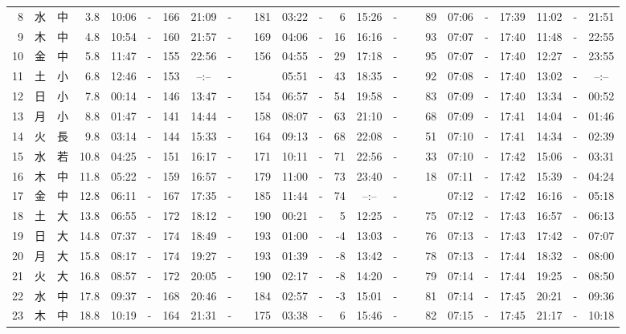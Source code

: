 \documentclass[12pt,a4j]{jsarticle}
\begin{document}
\begin{table}[htbp]
\begin{center}
{\begin{tabular}{|rc|cr|ccrccr|ccrccr|ccc|ccc|}
 8 & 水 & 中 &  3.8 &  10:06 &-& 166 &  21:09 &-& 181 &  03:22 &-&   6 &  15:26 &-&  89 & 07:06 & -& 17:39 & 11:02 & -& 21:51 \\
 9 & 木 & 中 &  4.8 &  10:54 &-& 160 &  21:57 &-& 169 &  04:06 &-&  16 &  16:16 &-&  93 & 07:07 & -& 17:40 & 11:48 & -& 22:55 \\
10 & 金 & 中 &  5.8 &  11:47 &-& 155 &  22:56 &-& 156 &  04:55 &-&  29 &  17:18 &-&  95 & 07:07 & -& 17:40 & 12:27 & -& 23:55 \\
11 & 土 & 小 &  6.8 &  12:46 &-& 153 &  --:-- &-&~~~~~ &  05:51 &-&  43 &  18:35 &-&  92 & 07:08 & -& 17:40 & 13:02 & -& --:-- \\
12 & 日 & 小 &  7.8 &  00:14 &-& 146 &  13:47 &-& 154 &  06:57 &-&  54 &  19:58 &-&  83 & 07:09 & -& 17:40 & 13:34 & -& 00:52 \\
13 & 月 & 小 &  8.8 &  01:47 &-& 141 &  14:44 &-& 158 &  08:07 &-&  63 &  21:10 &-&  68 & 07:09 & -& 17:41 & 14:04 & -& 01:46 \\
14 & 火 & 長 &  9.8 &  03:14 &-& 144 &  15:33 &-& 164 &  09:13 &-&  68 &  22:08 &-&  51 & 07:10 & -& 17:41 & 14:34 & -& 02:39 \\
15 & 水 & 若 & 10.8 &  04:25 &-& 151 &  16:17 &-& 171 &  10:11 &-&  71 &  22:56 &-&  33 & 07:10 & -& 17:42 & 15:06 & -& 03:31 \\
16 & 木 & 中 & 11.8 &  05:22 &-& 159 &  16:57 &-& 179 &  11:00 &-&  73 &  23:40 &-&  18 & 07:11 & -& 17:42 & 15:39 & -& 04:24 \\
17 & 金 & 中 & 12.8 &  06:11 &-& 167 &  17:35 &-& 185 &  11:44 &-&  74 &  --:-- &-&~~~~~ & 07:12 & -& 17:42 & 16:16 & -& 05:18 \\
18 & 土 & 大 & 13.8 &  06:55 &-& 172 &  18:12 &-& 190 &  00:21 &-&   5 &  12:25 &-&  75 & 07:12 & -& 17:43 & 16:57 & -& 06:13 \\
19 & 日 & 大 & 14.8 &  07:37 &-& 174 &  18:49 &-& 193 &  01:00 &-&  -4 &  13:03 &-&  76 & 07:13 & -& 17:43 & 17:42 & -& 07:07 \\
20 & 月 & 大 & 15.8 &  08:17 &-& 174 &  19:27 &-& 193 &  01:39 &-&  -8 &  13:42 &-&  78 & 07:13 & -& 17:44 & 18:32 & -& 08:00 \\
21 & 火 & 大 & 16.8 &  08:57 &-& 172 &  20:05 &-& 190 &  02:17 &-&  -8 &  14:20 &-&  79 & 07:14 & -& 17:44 & 19:25 & -& 08:50 \\
22 & 水 & 中 & 17.8 &  09:37 &-& 168 &  20:46 &-& 184 &  02:57 &-&  -3 &  15:01 &-&  81 & 07:14 & -& 17:45 & 20:21 & -& 09:36 \\
23 & 木 & 中 & 18.8 &  10:19 &-& 164 &  21:31 &-& 175 &  03:38 &-&   6 &  15:46 &-&  82 & 07:15 & -& 17:45 & 21:17 & -& 10:18 \\

\end{tabular}}
\end{center}
\end{table}
\end{document}
